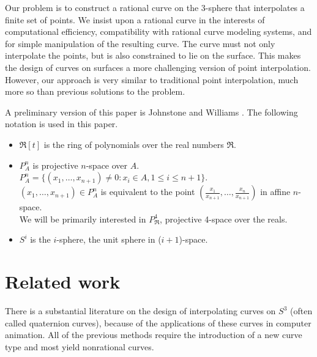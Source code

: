 Our problem is to construct a rational curve on the 3-sphere
that interpolates a finite set of points.
We insist upon a rational curve in the interests of computational efficiency,
compatibility with rational curve modeling systems,
and for simple manipulation of the resulting curve.
The curve must not only interpolate the points, but is also constrained
to lie on the surface.
This makes the design of curves on surfaces a more challenging version
of point interpolation.
However, our approach is very similar to traditional point interpolation,
much more so than previous solutions to the problem.

A preliminary version of this paper is Johnstone and Williams \cite{jjjw95}.
The following notation is used in this paper.
%
\begin{itemize}
\item
$\Re[t]$ is the ring of polynomials over the real numbers $\Re$.
\item
$P_A^{n}$ is projective $n$-space over $A$.
$P_A^{n} = \{(x_1,\ldots,x_{n+1}) \neq 0 : x_i \in A, 1 \leq i \leq n+1\}$.\\
$(x_1,\ldots,x_{n+1}) \in P_A^{n}$
is equivalent to the point $(\frac{x_1}{x_{n+1}}, \ldots, \frac{x_n}{x_{n+1}})$
in affine $n$-space.\\
We will be primarily interested in $P_{\Re}^4$, projective 4-space over the reals.
\item
$S^i$ is the $i$-sphere, the unit sphere in ($i+1$)-space.
\end{itemize}

\section{Related work}

There is a substantial literature on the design of interpolating curves on $S^3$
(often called quaternion curves),
because of the applications of these curves in computer animation.
All of the previous methods require the introduction of a new curve type
and most yield nonrational curves.


